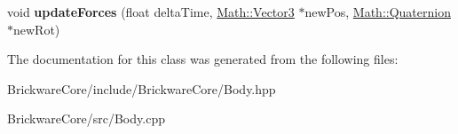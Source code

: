 \begin{DoxyCompactItemize}
\item 
\hypertarget{classBrickware_1_1Core_1_1Body_aad8699b28bbe60c2f9b5ca77fbfd4674}{}void {\bfseries update\+Forces} (float delta\+Time, \hyperlink{classBrickware_1_1Math_1_1Vector3}{Math\+::\+Vector3} $\ast$new\+Pos, \hyperlink{classBrickware_1_1Math_1_1Quaternion}{Math\+::\+Quaternion} $\ast$new\+Rot)\label{classBrickware_1_1Core_1_1Body_aad8699b28bbe60c2f9b5ca77fbfd4674}

\end{DoxyCompactItemize}


The documentation for this class was generated from the following files\+:\begin{DoxyCompactItemize}
\item 
Brickware\+Core/include/\+Brickware\+Core/Body.\+hpp\item 
Brickware\+Core/src/Body.\+cpp\end{DoxyCompactItemize}
